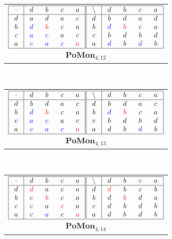 \documentclass{amsart}
\newcommand{\g}{\textcolor{blue}}
\newcommand{\rd}{\textcolor{red}}
\newcommand{\W}[1]{\makebox[12pt]{$#1$}}%
\begin{document}
\ 
\begin{tabular}[b]{c}
$\begin{array}{|c|cccc|}\hline
\W{\cdot}&\W{d}&\W{b}&\W{c}&\W{a}\\\hline
d&a&d&a&c\\
b&\g{d}&\rd{b}&c&a\\
c&\g{a}&\g{c}&a&c\\
a&\g{c}&\g{a}&\g{c}&\rd{a}\\
\hline
\end{array}$$\begin{array}{|c|cccc|}\hline
\W{\backslash}&\W{d}&\W{b}&\W{c}&\W{a}\\\hline
d&b&d&a&d\\
b&\g{d}&\rd{b}&c&a\\
c&b&d&b&d\\
a&\g{d}&b&\g{d}&b\\
\hline
\end{array}$\\
$\mathbf{PoMon}_{4,12}$
\end{tabular}
\ 
\begin{tabular}[b]{c}
$\begin{array}{|c|cccc|}\hline
\W{\cdot}&\W{d}&\W{b}&\W{c}&\W{a}\\\hline
d&b&d&a&c\\
b&\g{d}&\rd{b}&c&a\\
c&\g{a}&\g{c}&a&c\\
a&\g{c}&\g{a}&\g{c}&\rd{a}\\
\hline
\end{array}$$\begin{array}{|c|cccc|}\hline
\W{\backslash}&\W{d}&\W{b}&\W{c}&\W{a}\\\hline
d&b&d&a&c\\
b&\g{d}&\rd{b}&c&a\\
c&b&d&b&d\\
a&d&b&\g{d}&b\\
\hline
\end{array}$\\
$\mathbf{PoMon}_{4,13}$
\end{tabular}
\ 
\begin{tabular}[b]{c}
$\begin{array}{|c|cccc|}\hline
\W{\cdot}&\W{d}&\W{b}&\W{c}&\W{a}\\\hline
d&\rd{d}&a&c&a\\
b&c&\rd{b}&c&a\\
c&\g{c}&a&\rd{c}&a\\
a&c&\g{a}&c&\rd{a}\\
\hline
\end{array}$$\begin{array}{|c|cccc|}\hline
\W{\backslash}&\W{d}&\W{b}&\W{c}&\W{a}\\\hline
d&\rd{d}&b&c&b\\
b&d&\rd{b}&d&a\\
c&d&b&d&b\\
a&d&b&d&b\\
\hline
\end{array}$\\
$\mathbf{PoMon}_{4,14}$
\end{tabular}
\end{document}
